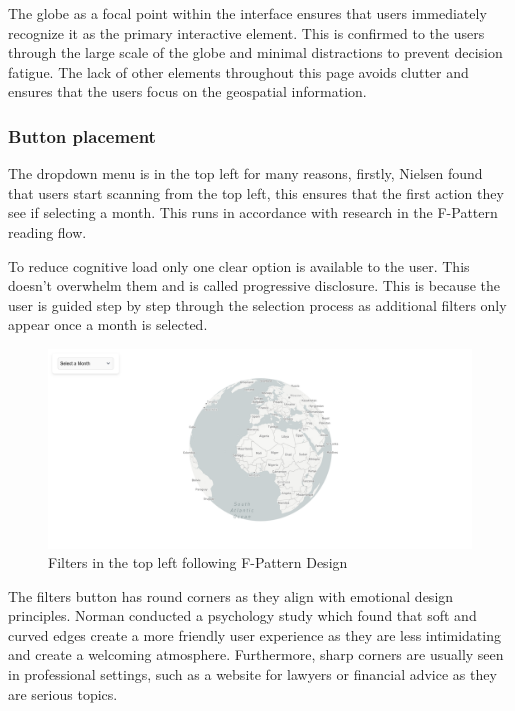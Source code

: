 \documentclass[]{project_final}
\begin{document}
The globe as a focal point within the interface ensures that users immediately recognize it as the primary interactive element. This is confirmed to the users through the large scale of the globe and minimal distractions to prevent decision fatigue. The lack of other elements throughout this page avoids clutter and ensures that the users focus on the geospatial information.

\subsubsection{Button placement}

The dropdown menu is in the top left for many reasons, firstly, Nielsen found that users start scanning from the top left, this ensures that the first action they see if selecting a month. This runs in accordance with research in the F-Pattern reading flow.

To reduce cognitive load only one clear option is available to the user. This doesn't overwhelm them and is called progressive disclosure. This is because the user is guided step by step through the selection process as additional filters only appear once a month is selected.

\begin{figure}[ht!]
  \centering
  \includegraphics[width=\textwidth]{1.png}
  \caption{Filters in the top left following F-Pattern Design}
  \label{fig:1}
\end{figure}

The filters button has round corners as they align with emotional design principles. Norman conducted a psychology study which found that soft and curved edges create a more friendly user experience as they are less intimidating and create a welcoming atmosphere.  Furthermore, sharp corners are usually seen in professional settings, such as a website for lawyers or financial advice as they are serious topics.
\end{document}
